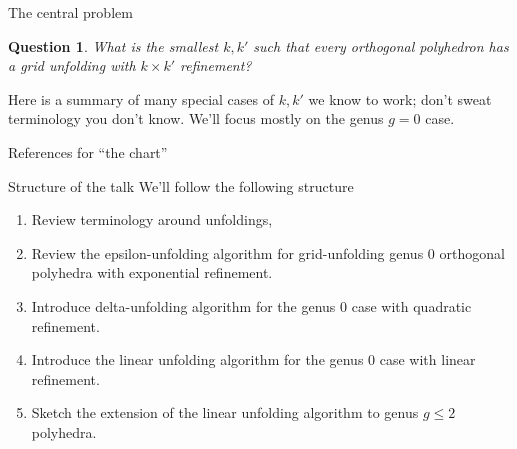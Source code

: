 \documentclass[handout]{beamer}
\theoremstyle{plain}
\newtheorem{question}{Question}
\begin{document}
  \begin{frame}{The central problem}
    \begin{question}
      What is the smallest $k,k'$ such that every orthogonal polyhedron has a grid unfolding with $k \times k'$ refinement?
    \end{question}
    \pause Here is a summary of many special cases of $k,k'$ we know to work;
    don't sweat terminology you don't know.
      \pause We'll focus mostly on the genus $g = 0$ case.
  \end{frame}

  \begin{frame}{References for ``the chart''}
    \printbibliography
  \end{frame}

  \begin{frame}{Structure of the talk}
    We'll follow the following structure
    \begin{enumerate}
      \item Review terminology around unfoldings,
      \pause \item Review the epsilon-unfolding algorithm for grid-unfolding genus 0 orthogonal polyhedra with exponential refinement.
      \pause \item Introduce delta-unfolding algorithm for the genus $0$ case with quadratic refinement. 
      \pause \item Introduce the linear unfolding algorithm for the genus 0 case with linear refinement.
      \pause \item Sketch the extension of the linear unfolding algorithm to genus $g \leq 2$ polyhedra.
    \end{enumerate}
  \end{frame}
\end{document}
